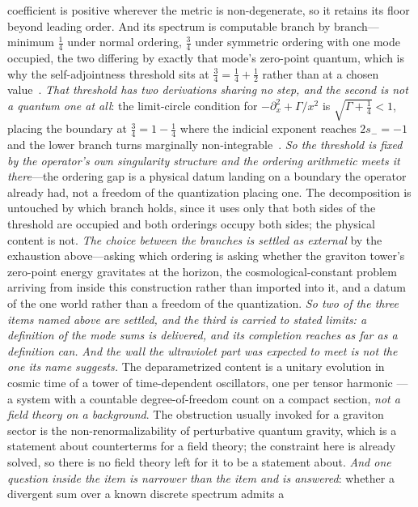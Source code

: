 \documentclass[11pt,a4paper]{article}
\theoremstyle{plain}
\theoremstyle{definition}
\theoremstyle{remark}
\begin{document}
\begin{enumerate}
{coefficient is positive wherever the metric is non-degenerate, so it retains its floor beyond
leading order.  And its spectrum is computable branch by branch---minimum $\tfrac14$ under normal
ordering, $\tfrac34$ under symmetric ordering with one mode occupied, the two differing by exactly
that mode's zero-point quantum, which is why the self-adjointness threshold sits at
$\tfrac34=\tfrac14+\tfrac12$ rather than at a chosen value~\cite{JanzenCanonicalTime}.
\emph{That threshold has two derivations sharing no step, and the second is not a quantum one at
all}: the limit-circle condition for $-\partial_x^2+\Gamma/x^2$ is $\sqrt{\Gamma+\tfrac14}<1$,
placing the boundary at $\tfrac34=1-\tfrac14$ where the indicial exponent reaches $2s_-=-1$ and the
lower branch turns marginally non-integrable~.  \emph{So the
threshold is fixed by the operator's own singularity structure and the ordering arithmetic meets it
there}---the ordering gap is a physical datum landing on a boundary the operator already had, not a
freedom of the quantization placing one.  The
decomposition is untouched by which branch holds, since it uses only that both sides of the
threshold are occupied and both orderings occupy both sides; the physical content is not.  \emph{The
choice between the branches is settled as \emph{external}} by the exhaustion above---asking which
ordering is asking whether the graviton tower's zero-point energy gravitates at the horizon, the
cosmological-constant problem arriving from inside this construction rather than imported into it,
and a datum of the one world rather than a freedom of the quantization.  \emph{So two of the three
items named above are settled, and the third is carried to stated limits: a definition of the mode sums is
delivered, and its \emph{completion} reaches as far as a definition can.}} \emph{And the
wall the ultraviolet part was expected to meet is not the one its name suggests.} The deparametrized content is a unitary
evolution in cosmic time of a tower of time-dependent oscillators, one per tensor harmonic --- a system with a
countable degree-of-freedom count on a compact section, \emph{not a field theory on a background}. The
obstruction usually invoked for a graviton sector is the non-renormalizability of perturbative quantum
gravity, which is a statement about counterterms for a field theory; the constraint here is already solved,
so there is no field theory left for it to be a statement about. \emph{And one question inside the item is
narrower than the item and is answered}: whether a divergent sum over a known discrete spectrum admits a

\end{enumerate}
\end{document}
